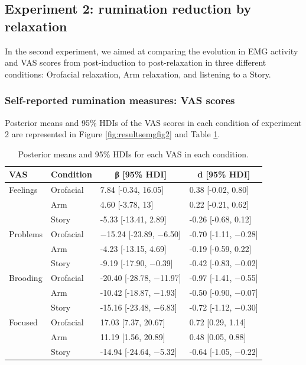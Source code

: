 \documentclass[a4paper,12pt,twoside,openright,oldfontcommands,final]{memoir}
\begin{document}
\hypertarget{experiment-2-rumination-reduction-by-relaxation-1}{%
\subsection{Experiment 2: rumination reduction by relaxation}\label{experiment-2-rumination-reduction-by-relaxation-1}}

In the second experiment, we aimed at comparing the evolution in EMG activity and VAS scores from post-induction to post-relaxation in three different conditions: Orofacial relaxation, Arm relaxation, and listening to a Story.

\hypertarget{self-reported-rumination-measures-vas-scores-1}{%
\subsubsection{Self-reported rumination measures: VAS scores}\label{self-reported-rumination-measures-vas-scores-1}}

Posterior means and 95\% HDIs of the VAS scores in each condition of experiment 2 are represented in Figure \ref{fig:resultsemgfig2} and Table \ref{tab:table2}.

\begin{table}[H]
\begin{center}
\begin{threeparttable}
\caption{\label{tab:table2}Posterior means and 95\% HDIs for each VAS in each condition.}
\small{
\begin{tabular}{llll}
\toprule
VAS & \multicolumn{1}{c}{Condition} & \multicolumn{1}{c}{β [95\% HDI]} & \multicolumn{1}{c}{d [95\% HDI]}\\
\midrule
Feelings & Orofacial & 7.84 [-0.34, 16.05] & 0.38 [-0.02, 0.80]\\
 & Arm & 4.60 [-3.78, 13] & 0.22 [-0.21, 0.62]\\
 & Story & -5.33 [-13.41, 2.89] & -0.26 [-0.68, 0.12]\\
Problems & Orofacial & −15.24 [-23.89, −6.50] & -0.70 [-1.11, −0.28]\\
 & Arm & -4.23 [-13.15, 4.69] & -0.19 [-0.59, 0.22]\\
 & Story & -9.19 [-17.90, −0.39] & -0.42 [-0.83, −0.02]\\
Brooding & Orofacial & -20.40 [-28.78, −11.97] & -0.97 [-1.41, −0.55]\\
 & Arm & -10.42 [-18.87, −1.93] & -0.50 [-0.90, −0.07]\\
 & Story & -15.16 [-23.48, −6.83] & -0.72 [-1.12, −0.30]\\
Focused & Orofacial & 17.03 [7.37, 20.67] & 0.72 [0.29, 1.14]\\
 & Arm & 11.19 [1.56, 20.89] & 0.48 [0.05, 0.88]\\
 & Story & -14.94 [-24.64, −5.32] & -0.64 [-1.05, −0.22]\\
\bottomrule
\end{tabular}
}
\end{threeparttable}
\end{center}
\end{table}
\end{document}
